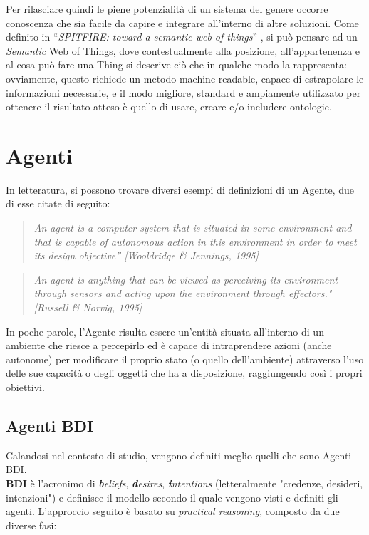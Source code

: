 \documentclass[12pt,a4paper,openright,oneside]{report}
\newcommand{\quotes}[1]{``#1''}
\begin{document}
Per rilasciare quindi le piene potenzialità di un sistema del genere occorre conoscenza che sia facile da capire e integrare all'interno di altre soluzioni. Come definito in \quotes{\textit{SPITFIRE: toward a semantic web of things}} \cite{semantic-wot}, si può pensare ad un \textit{Semantic} Web of Things, dove contestualmente alla posizione, all'appartenenza e al cosa può fare una Thing si descrive ciò che in qualche modo la rappresenta: ovviamente, questo richiede un metodo machine-readable, capace di estrapolare le informazioni necessarie, e il modo migliore, standard e ampiamente utilizzato per ottenere il risultato atteso è quello di usare, creare e/o includere ontologie.\\


\section{Agenti}
In letteratura, si possono trovare diversi esempi di definizioni di un Agente, due di esse citate di seguito:

\begin{quotation}
	\textit{
		An agent is a computer system that is situated in some
		environment and that is capable of autonomous action in
		this environment in order to meet its design
		objective” [Wooldridge \& Jennings, 1995]}
\end{quotation}

\begin{quotation}
	\textit{
		An agent is anything that can be viewed as perceiving its
		environment through sensors and acting upon the
		environment through effectors." [Russell \& Norvig, 1995]}
\end{quotation}

In poche parole, l'Agente risulta essere un'entità situata all'interno di un ambiente che riesce a percepirlo ed è capace di intraprendere azioni (anche autonome) per modificare il proprio stato (o quello dell'ambiente) attraverso l'uso delle sue capacità o degli oggetti che ha a disposizione, raggiungendo così i propri obiettivi.\\


\subsection{Agenti BDI}
Calandosi nel contesto di studio, vengono definiti meglio quelli che sono Agenti BDI.\\

\textbf{BDI} è l'acronimo di \textit{\textbf{b}eliefs}, \textit{\textbf{d}esires}, \textit{\textbf{i}ntentions} (letteralmente "credenze, desideri, intenzioni") e definisce il modello secondo il quale vengono visti e definiti gli agenti. L'approccio seguito è basato su \textit{practical reasoning}, composto da due diverse fasi:
\end{document}
